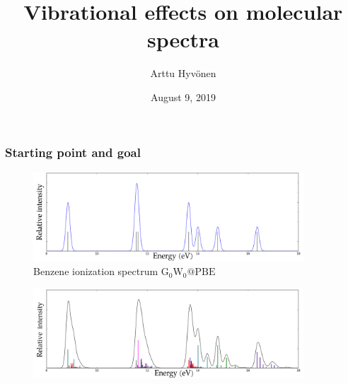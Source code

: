 \documentclass[12pt, fleqn]{beamer}
\title{Vibrational effects on molecular spectra}
\author{Arttu Hyv\"onen}
\date{August 9, 2019}
\begin{document}
\maketitle

\begin{frame}
    \frametitle{Starting point and goal}
    \begin{figure}[h!]
        \centering
        \caption*{Benzene ionization spectrum $\mathrm{G_0W_0 @PBE}$}
        \includegraphics[width=0.9\textwidth]{zz_peaks.png}
    \end{figure}
    \pause
    \begin{figure}[h!]
        \centering
        \includegraphics[width=0.9\textwidth]{all_peaks.png}
    \end{figure}
\end{frame}
\end{document}
